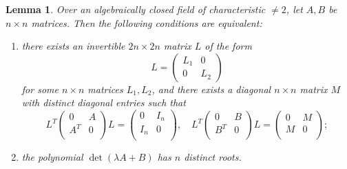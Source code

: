 \documentclass[10pt,a4paper]{amsart}
\theoremstyle{plain}
\newtheorem{lem}[thm]{Lemma}
\theoremstyle{definition}
\begin{document}
\begin{lem}\label{lem:elementary}
Over an algebraically closed field of characteristic $\neq 2$, let $A, B$ be $n\times n$ matrices.
Then the following conditions are equivalent:
\begin{enumerate}
\item\label{item:change-of-basis} there exists an invertible $2n\times 2n$ matrix $L$ of the form
\[
L = \begin{pmatrix}
L_1 & 0\\
0 & L_2
\end{pmatrix}
\]
for some $n\times n$ matrices $L_1,L_2$,
and there exists a diagonal $n\times n$ matrix $M$ with distinct diagonal entries such that
\[
L^T
\begin{pmatrix}
0 & A \\
A^T & 0 \\
\end{pmatrix}L =
\begin{pmatrix}
0 & I_n \\
I_n & 0 \\
\end{pmatrix}, \quad
L^T
\begin{pmatrix}
0 & B \\
B^T & 0 \\
\end{pmatrix}L =
\begin{pmatrix}
0 & M \\
M & 0 \\
\end{pmatrix};
\]
\item\label{item:polynomial-separable} the polynomial $\det(\lambda A+ B)$ has $n$ distinct roots.
\end{enumerate}
\end{lem}
\end{document}
